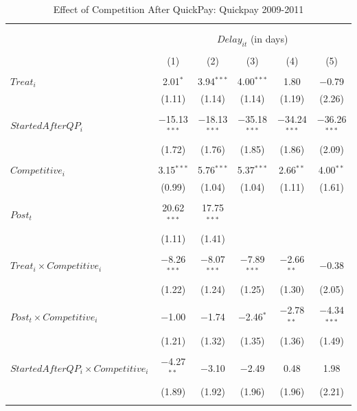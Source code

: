 \documentclass[
]{article}
\begin{document}
\begin{table}[H] \centering 
  \caption{Effect of Competition After QuickPay: Quickpay 2009-2011} 
  \label{} 
\small 
\begin{tabular}{@{\extracolsep{-2pt}}lccccc} 
\\[-1.8ex]\hline 
\hline \\[-1.8ex] 
\\[-1.8ex] & \multicolumn{5}{c}{$Delay_{it}$ (in days)} \\ 
\\[-1.8ex] & (1) & (2) & (3) & (4) & (5)\\ 
\hline \\[-1.8ex] 
 $Treat_i$ & 2.01$^{*}$ & 3.94$^{***}$ & 4.00$^{***}$ & 1.80 & $-$0.79 \\ 
  & (1.11) & (1.14) & (1.14) & (1.19) & (2.26) \\ 
  & & & & & \\ 
 $StartedAfterQP_i$ & $-$15.13$^{***}$ & $-$18.13$^{***}$ & $-$35.18$^{***}$ & $-$34.24$^{***}$ & $-$36.26$^{***}$ \\ 
  & (1.72) & (1.76) & (1.85) & (1.86) & (2.09) \\ 
  & & & & & \\ 
 $Competitive_i$ & 3.15$^{***}$ & 5.76$^{***}$ & 5.37$^{***}$ & 2.66$^{**}$ & 4.00$^{**}$ \\ 
  & (0.99) & (1.04) & (1.04) & (1.11) & (1.61) \\ 
  & & & & & \\ 
 $Post_t$ & 20.62$^{***}$ & 17.75$^{***}$ &  &  &  \\ 
  & (1.11) & (1.41) &  &  &  \\ 
  & & & & & \\ 
 $Treat_i \times Competitive_i$ & $-$8.26$^{***}$ & $-$8.07$^{***}$ & $-$7.89$^{***}$ & $-$2.66$^{**}$ & $-$0.38 \\ 
  & (1.22) & (1.24) & (1.25) & (1.30) & (2.05) \\ 
  & & & & & \\ 
 $Post_t \times Competitive_i$ & $-$1.00 & $-$1.74 & $-$2.46$^{*}$ & $-$2.78$^{**}$ & $-$4.34$^{***}$ \\ 
  & (1.21) & (1.32) & (1.35) & (1.36) & (1.49) \\ 
  & & & & & \\ 
 $StartedAfterQP_i \times Competitive_i$ & $-$4.27$^{**}$ & $-$3.10 & $-$2.49 & 0.48 & 1.98 \\ 
  & (1.89) & (1.92) & (1.96) & (1.96) & (2.21) \\ 
  & & & & & \\ 

\end{tabular}
\end{table}
\end{document}
